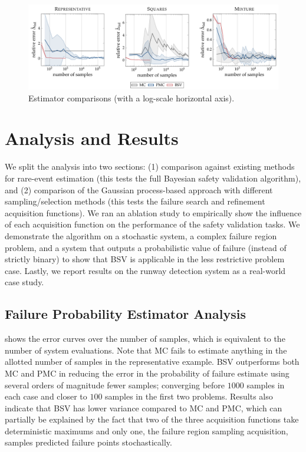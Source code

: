 \begin{figure}[b!]
    \begin{center}
    \includegraphics[width=\textwidth]{figures/bsv/toys/mc_pmc_bsv.pdf}
    \caption{Estimator comparisons (with a log-scale horizontal axis).}
    \label{fig:pmc}
    \end{center}
\end{figure}


\section{Analysis and Results}\label{sec:bsv_results}
We split the analysis into two sections: (1) comparison against existing methods for rare-event estimation (this tests the full Bayesian safety validation algorithm), and (2) comparison of the Gaussian process-based approach with different sampling/selection methods (this tests the failure search and refinement acquisition functions).
We ran an ablation study to empirically show the influence of each acquisition function on the performance of the safety validation tasks.
We demonstrate the algorithm on a stochastic system, a complex failure region problem, and a system that outputs a probabilistic value of failure (instead of strictly binary) to show that BSV is applicable in the less restrictive problem case.
Lastly, we report results on the runway detection system as a real-world case study.


\subsection{Failure Probability Estimator Analysis}
 shows the error curves over the number of samples, which is equivalent to the number of system evaluations.
Note that MC fails to estimate anything in the allotted number of samples in the representative example.
BSV outperforms both MC and PMC in reducing the error in the probability of failure estimate using several orders of magnitude fewer samples; converging before $1000$ samples in each case and closer to $100$ samples in the first two problems.
Results also indicate that BSV has lower variance compared to MC and PMC, which can partially be explained by the fact that two of the three acquisition functions take deterministic maximums and only one, the failure region sampling acquisition, samples predicted failure points stochastically.


